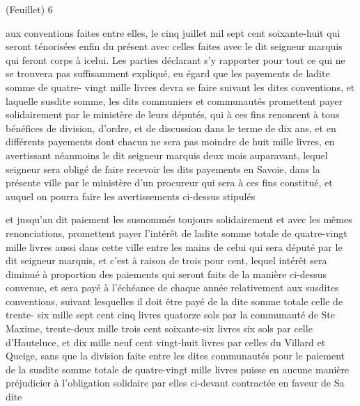 \documentclass[a4paper,twoside,openany]{article}
\begin{document}
\begin{flushright}
(Feuillet) 6
\end{flushright}	
aux conventions faites entre elles, le cinq juillet
mil sept cent soixante-huit qui seront ténorisées
enfin du présent avec celles faites avec le dit
seigneur marquis qui feront corps à icelui. Les
parties déclarant s'y rapporter pour tout ce qui
ne se trouvera pas suffisamment expliqué, eu
égard que les payements de ladite somme de quatre-
vingt mille livres devra se faire suivant les dites
conventions, et laquelle susdite somme, les dits
communiers et communautés promettent payer
solidairement par le ministère de leurs députés,
qui à ces fins renoncent à tous bénéfices de
division, d’ordre, et de discussion dans le terme
de dix ans, et en différents payements dont
chacun ne sera pas moindre de huit mille livres,
en avertissant néanmoins le dit seigneur marquis
deux mois auparavant, lequel seigneur sera obligé
de faire recevoir les dits payements en Savoie,
dans la présente ville par le ministère d'un
procureur qui sera à ces fins constitué, et auquel
on pourra faire les avertissements ci-dessus stipulés


et jusqu’au dit paiement les susnommés toujours 
solidairement et  avec les mêmes renonciations,
promettent payer l’intérêt de ladite somme
totale de quatre-vingt mille livres aussi dans
cette ville entre les mains de celui qui sera
député par le dit seigneur marquis, et c’est à raison
de trois pour cent, lequel intérêt sera diminué
à proportion des paiements qui seront faits de
la manière ci-dessus convenue, et sera payé à
l’échéance de chaque année relativement
aux susdites conventions, suivant lesquelles il doit
être payé de la dite somme totale celle de trente-
six mille sept cent cinq livres quatorze sols
par la communauté de Ste Maxime, trente-deux
mille trois cent soixante-six livres six sols
par celle d’Hauteluce, et dix mille neuf cent
vingt-huit livres par celles du Villard et  Queige,
sans que la division faite entre les dites communautés
pour le paiement de la susdite somme totale
de quatre-vingt mille livres puisse en aucune
manière préjudicier à l’obligation solidaire par
elles ci-devant contractée en faveur de Sa dite

\end{document}

